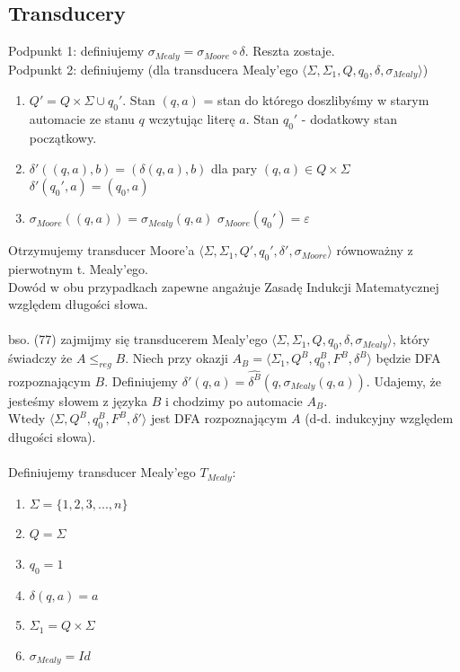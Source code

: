 \documentclass[a4paper,11pt]{article}
\newenvironment{zadanie}[1]
  {\renewcommand\theinnercustomthm{#1}\innercustomthm}
  {\endinnercustomthm}
\begin{document}
\subsection{\Large{Transducery}}

\begin{zadanie}{77}
\end{zadanie}
Podpunkt 1: definiujemy $\sigma_{Mealy} = \sigma_{Moore} \circ \delta$. Reszta zostaje.\\
Podpunkt 2: definiujemy (dla transducera Mealy'ego $\langle \Sigma, \Sigma_1, Q, q_0, \delta, \sigma_{Mealy} \rangle$)
\begin{enumerate}
 \item $Q' = Q \times \Sigma \cup q_0'$. Stan $(q,a)$ = stan do którego doszlibyśmy w starym automacie ze stanu $q$ wczytując
 literę $a$. Stan $q_0'$ - dodatkowy stan początkowy.
 \item 
 \subitem $\delta'((q,a),b) = (\delta(q,a),b)$ dla pary $(q,a) \in Q \times \Sigma$
 \subitem $\delta'(q_0',a) = (q_0,a)$
 \item
 \subitem $\sigma_{Moore}((q,a)) = \sigma_{Mealy}(q,a)$
 \subitem $\sigma_{Moore}(q_0') = \varepsilon$
\end{enumerate}
Otrzymujemy transducer Moore'a $\langle \Sigma, \Sigma_1, Q', q_0', \delta', \sigma_{Moore} \rangle$ równoważny z pierwotnym
t. Mealy'ego. \\
Dowód w obu przypadkach zapewne angażuje Zasadę Indukcji Matematycznej względem długości słowa. \\ \\ 

\begin{zadanie}{78}
\end{zadanie}
bso. (77) zajmijmy się transducerem Mealy'ego $\langle \Sigma, \Sigma_1, Q, q_0, \delta, \sigma_{Mealy} \rangle$, który 
świadczy że $A \leqslant_{reg}B$. Niech przy okazji $A_B = \langle \Sigma_1, Q^B, q_0^B, F^B, \delta^B\rangle$ będzie DFA
rozpoznającym $B$. Definiujemy $\delta'(q,a) = \widehat{\delta^B}(q,\sigma_{Mealy}(q,a))$. Udajemy, że jesteśmy słowem z języka
$B$ i chodzimy po automacie $A_B$.\\
Wtedy $\langle \Sigma, Q^B, q_0^B, F^B, \delta' \rangle$ jest DFA rozpoznającym $A$ (d-d. indukcyjny względem długości słowa). \\ \\

\begin{zadanie}{79}
\end{zadanie}
Definiujemy transducer Mealy'ego $T_{Mealy}$:
\begin{enumerate}
 \item $\Sigma = \{1,2,3,...,n\}$
 \item $Q = \Sigma$
 \item $q_0 = 1$
 \item $\delta(q,a) = a$
 \item $\Sigma_1 = Q \times \Sigma$
 \item $\sigma_{Mealy} = Id$
\end{enumerate}
\end{document}
